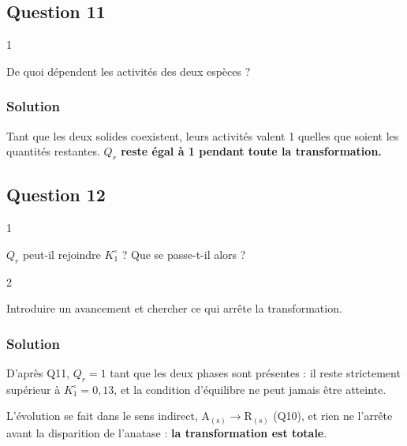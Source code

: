 \documentclass[11pt,a4paper]{article}
\begin{document}
\hypertarget{question-11}{%
\subsection{Question 11}\label{question-11}}

\begin{indication}{1}

De quoi dépendent les activités des deux espèces ?

\end{indication}

\hypertarget{solution-10}{%
\subsubsection{Solution}\label{solution-10}}

Tant que les deux solides coexistent, leurs activités valent 1 quelles que soient les quantités restantes. \textbf{\(Q_r\) reste égal à 1 pendant toute la transformation.}

\hypertarget{question-12}{%
\subsection{Question 12}\label{question-12}}

\begin{indication}{1}

\(Q_r\) peut-il rejoindre \(K^\circ_1\) ? Que se passe-t-il alors ?

\end{indication}

\begin{indication}{2}

Introduire un avancement et chercher ce qui arrête la transformation.

\end{indication}

\hypertarget{solution-11}{%
\subsubsection{Solution}\label{solution-11}}

D'après Q11, \(Q_r = 1\) tant que les deux phases sont présentes : il reste strictement supérieur à \(K^\circ_1 = 0{,}13\), et la condition d'équilibre ne peut jamais être atteinte.

L'évolution se fait dans le sens indirect, \(\mathrm{A_{(s)}} \to \mathrm{R_{(s)}}\) (Q10), et rien ne l'arrête avant la disparition de l'anatase : \textbf{la transformation est totale}.
\end{document}
